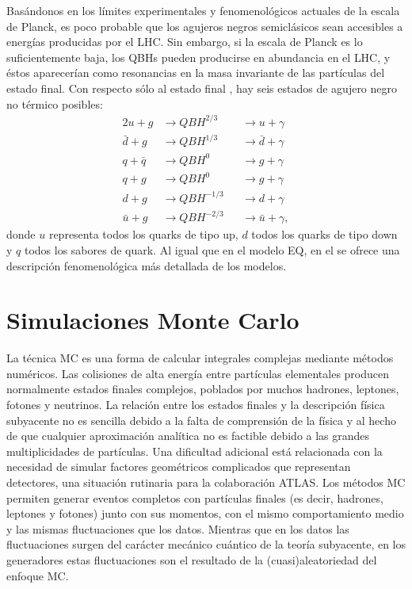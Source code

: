 Basándonos en los límites experimentales y fenomenológicos actuales de la escala de Planck, es poco probable que los agujeros negros semiclásicos sean accesibles a energías producidas por el \ac{LHC}. Sin embargo, si la escala de Planck es lo suficientemente baja, los \acp{QBH} pueden producirse en abundancia en el \ac{LHC}, y éstos aparecerían como resonancias en la masa invariante de las partículas del estado final. Con respecto sólo al estado final \gammajet, hay seis estados de agujero negro no térmico posibles:
\begin{alignat*}{2}
    u + g       & \to QBH^{2/3}     && \to u + \gamma\\
    \bar{d} + g & \to QBH^{1/3}     && \to \bar{d} + \gamma\\
    q + \bar{q} & \to QBH^{0}       && \to g + \gamma\\
    q + g       & \to QBH^{0}       && \to g + \gamma\\
    d + g       & \to QBH^{-1/3}    && \to d + \gamma\\
    \bar{u} + g & \to QBH^{-2/3}    && \to \bar{u} + \gamma,
\end{alignat*}
donde \(u\) representa todos los quarks de tipo up, \(d\) todos los quarks de tipo down y \(q\) todos los sabores de quark. Al igual que en el modelo \ac{EQ}, en el  se ofrece una descripción fenomenológica más detallada de los modelos.












\section{Simulaciones Monte Carlo}
\label{sec:theory:mc_simulation}


La técnica \ac{MC} es una forma de calcular integrales complejas mediante métodos numéricos. Las colisiones de alta energía entre partículas elementales producen normalmente estados finales complejos, poblados por muchos hadrones, leptones, fotones y neutrinos. La relación entre los estados finales y la descripción física subyacente no es sencilla debido a la falta de comprensión de la física y al hecho de que cualquier aproximación analítica no es factible debido a las grandes multiplicidades de partículas. Una dificultad adicional está relacionada con la necesidad de simular factores geométricos complicados que representan detectores, una situación rutinaria para la colaboraci\'on \ac{ATLAS}.
Los métodos \ac{MC} permiten generar eventos completos con partículas finales (es decir, hadrones, leptones y fotones) junto con sus momentos, con el mismo comportamiento medio y las mismas fluctuaciones que los datos. Mientras que en los datos las fluctuaciones surgen del carácter mecánico cuántico de la teoría subyacente, en los generadores estas fluctuaciones son el resultado de la (cuasi)aleatoriedad del enfoque \ac{MC}.

